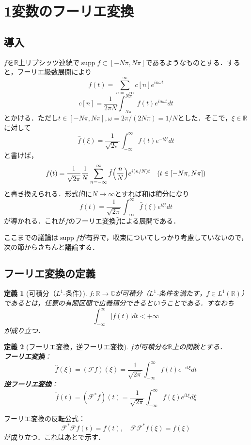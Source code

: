 \documentclass[dvipdfmx,a4j,10pt]{jsarticle}
\theoremstyle{mystyle1}
\theoremstyle{mystyle3}
\theoremstyle{mystyle4}
\theoremstyle{mystyle6}
\newtheorem{definition}{定義}[section]
\theoremstyle{mystyle2}
\theoremstyle{mystyle5}
\newenvironment{dfn}[1][]
{\begin{tcolorbox}[
    enhanced,
    boxrule=0pt,
    arc=0mm,
    frame hidden,
    borderline west={2pt}{-4pt}{green!60!black},
    breakable = true
    ]
    \begin{definition}[#1]
}
{\end{definition}\end{tcolorbox}}
\DeclareMathOperator{\supp}{supp}
\begin{document}
\section{1変数のフーリエ変換}

\subsection{導入}

$f$を$\mathbb{R}$上リプシッツ連続で$\supp f\subset[-N\pi,N\pi]$であるようなものとする．すると，フーリエ級数展開により
\[
	f(t)=\sum_{n=-\infty}^\infty c[n]e^{in\omega t}
\]
\[
	c[n]=\frac{1}{2\pi N}\int_{-N\pi}^{N\pi}f(t)e^{in\omega t}dt
\]
とかける．ただし$t\in[-N\pi,N\pi],\omega=2\pi/(2N\pi)=1/N$とした．そこで，$\xi\in\mathbb{R}$に対して
\[
	\hat f(\xi)=\frac{1}{\sqrt{2\pi}}  \int_{-\infty}^\infty f(t)e^{-i\xi t}dt
\]
と書けば，
\[
	f(t)=\frac{1}{\sqrt{2\pi}}\frac{1}{N}\sum_{n=-\infty}^\infty \hat f\mleft(\frac{n}{N}\mright)e^{i(n/N)t}\quad(t\in[-N\pi,N\pi])
\]
と書き換えられる．形式的に$N\to\infty$とすれば和は積分になり
\[
	f(t)=\frac{1}{\sqrt{2\pi}}\int_{-\infty}^\infty\hat f(\xi)e^{i\xi t}dt
\]
が導かれる．これが$f$のフーリエ変換$\hat f$による展開である．

ここまでの議論は$\supp f$が有界で，収束についてしっかり考慮していないので，次の節からきちんと議論する．

\subsection{フーリエ変換の定義}

\begin{dfn}[可積分（$L^1$-条件）]
	$f:\mathbb{R}\to\mathbb{C}$が可積分（$L^1$-条件を満たす，$f\in L^1(\mathbb{R})$）であるとは，任意の有限区間で広義積分できるということである．すなわち
	\[
		\int_{-\infty}^\infty |f(t)|dt<+\infty
	\]
	が成り立つ．
\end{dfn}

\begin{dfn}[フーリエ変換，逆フーリエ変換]
	$f$が可積分な$\mathbb{R}$上の関数とする．\\
	\textbf{フーリエ変換}：
	\[
		\hat f(\xi)=(\mathcal{F}f)(\xi)=\frac{1}{\sqrt{2\pi}}\int_{-\infty}^\infty f(t)e^{-it\xi}dt
	\]
	\textbf{逆フーリエ変換}：
	\[
		\check{f}(t)=(\mathcal{F}^*f)(t)=\frac{1}{\sqrt{2\pi}}\int_{-\infty}^\infty f(\xi)e^{it\xi}d\xi
	\]
\end{dfn}

フーリエ変換の反転公式：
\[
	\mathcal{F}^*\mathcal{F}f(t)=f(t),\quad \mathcal{F}\mathcal{F}^*f(\xi)=f(\xi)
\]
が成り立つ．これはあとで示す．
\end{document}
